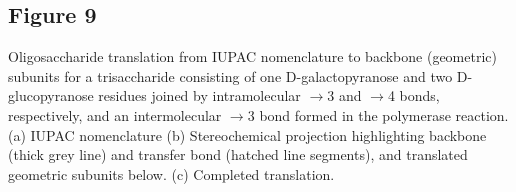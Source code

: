 \documentclass{article}
\begin{document}
\subsection{Figure 9}
Oligosaccharide translation from IUPAC nomenclature to backbone (geometric) subunits for a trisaccharide consisting of one D-galactopyranose and two D-glucopyranose residues joined by intramolecular $\rightarrow$3 and $\rightarrow$4 bonds, respectively, and an intermolecular $\rightarrow$3 bond formed in the polymerase reaction. (a) IUPAC nomenclature (b) Stereochemical projection highlighting backbone (thick grey line) and transfer bond (hatched line segments), and translated geometric subunits below. (c) Completed translation.
\end{document}
